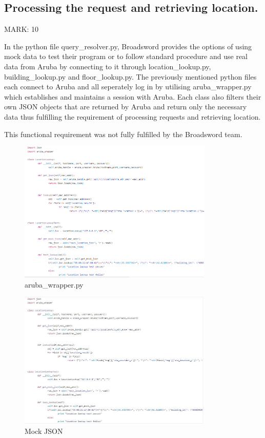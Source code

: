 \documentclass{article}
\begin{document}
\subsection{Processing the request and retrieving location.}
\begin{flushleft}MARK: 10\end{flushleft}
In the python file query\_resolver.py, Broadsword provides the options of using mock data to test their program or to follow standard procedure and use real data from Aruba by connecting to it through location\_lookup.py, building\_lookup.py and floor\_lookup.py. The previously mentioned python files each connect to Aruba and all seperately log in by utilising aruba\_wrapper.py which establishes and maintains a session with Aruba. Each class also filters their own JSON objects that are returned by Aruba and return only the necessary data thus fulfilling the requirement of processing requests and retrieving location.   
\begin{flushleft}This functional requirement was not fully fulfilled by the Broadsword team.\end{flushleft}
\begin{figure}[ht]
  \includegraphics[width=350px]{Images/getLoc.PNG}
  \caption{aruba\_wrapper.py}
  \label{fig:aruba\_wrapper.py}
\end{figure}
\begin{figure}[ht]
  \includegraphics[width=350px]{Images/LocLookup.JPG}
  \caption{Mock JSON}
  \label{Mock JSON}
\end{figure}
\end{document}
